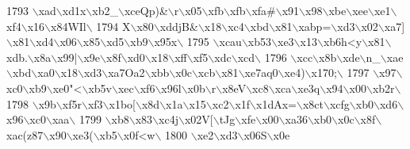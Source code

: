 \begin{DoxyCode}
{1793 \textcolor{stringliteral}{\(\backslash\)xad\(\backslash\)xd1x\(\backslash\)xb2\_\(\backslash\)xceQp)&\(\backslash\)r\(\backslash\)x05\(\backslash\)xfb\(\backslash\)xfb\(\backslash\)xfa#\(\backslash\)x91\(\backslash\)x98\(\backslash\)xbe\(\backslash\)xee\(\backslash\)xe1\(\backslash\)xf4\(\backslash\)x16\(\backslash\)x84WIl\(\backslash\)}
1794 \textcolor{stringliteral}{X\(\backslash\)x80\(\backslash\)xddjB&\(\backslash\)x18\(\backslash\)xc4\(\backslash\)xbd\(\backslash\)x81\(\backslash\)xabp=\(\backslash\)xd3\(\backslash\)x02\(\backslash\)xa7]\(\backslash\)x81\(\backslash\)xd4\(\backslash\)x06\(\backslash\)x85\(\backslash\)xd5\(\backslash\)xb9\(\backslash\)x95x\(\backslash\)}
1795 \textcolor{stringliteral}{\(\backslash\)xcau\(\backslash\)xb53\(\backslash\)xe3\(\backslash\)x13\(\backslash\)xb6h<y\(\backslash\)x81\(\backslash\)xdb.\(\backslash\)x8a\(\backslash\)x99|\(\backslash\)x9e\(\backslash\)x8f\(\backslash\)xd0\(\backslash\)x18\(\backslash\)xff\(\backslash\)xf5\(\backslash\)xdc\(\backslash\)xcd\(\backslash\)}
1796 \textcolor{stringliteral}{\(\backslash\)xcc\(\backslash\)x8b\(\backslash\)xde\(\backslash\)n\_\(\backslash\)xae\(\backslash\)xbd\(\backslash\)xa0\(\backslash\)x18\(\backslash\)xd3\(\backslash\)xa7Oa2\(\backslash\)xbb\(\backslash\)x0c\(\backslash\)xcb\(\backslash\)x81\(\backslash\)xe7aq0\(\backslash\)xe4)\(\backslash\)x170;\(\backslash\)}
1797 \textcolor{stringliteral}{\(\backslash\)x97\(\backslash\)xc0\(\backslash\)xb9\(\backslash\)xe0"<\(\backslash\)xb5v\(\backslash\)xec\(\backslash\)xf6\(\backslash\)x96l\(\backslash\)x0b\(\backslash\)r\(\backslash\)x8eV\(\backslash\)xc8\(\backslash\)xca\(\backslash\)xe3q\(\backslash\)x94\(\backslash\)x00\(\backslash\)xb2r\(\backslash\)}
1798 \textcolor{stringliteral}{\(\backslash\)x9b\(\backslash\)xf5r\(\backslash\)xf3\(\backslash\)x1bo[\(\backslash\)x8d\(\backslash\)x1a\(\backslash\)x15\(\backslash\)xc2\(\backslash\)x1f\(\backslash\)x1dAx=\(\backslash\)x8ct\(\backslash\)xcfg\(\backslash\)xb0\(\backslash\)xd6\(\backslash\)x96\(\backslash\)xc0\(\backslash\)xaa\(\backslash\)}
1799 \textcolor{stringliteral}{\(\backslash\)xb8\(\backslash\)x83\(\backslash\)xc4j\(\backslash\)x02V[\(\backslash\)tJg\(\backslash\)xfe\(\backslash\)x00\(\backslash\)xa36\(\backslash\)xb0\(\backslash\)x0c\(\backslash\)x8f\(\backslash\)xac(z87\(\backslash\)x90\(\backslash\)xe3(\(\backslash\)xb5\(\backslash\)x0f<w\(\backslash\)}
1800 \textcolor{stringliteral}{\(\backslash\)xe2\(\backslash\)xd3\(\backslash\)x06S\(\backslash\)x0e%
}}
\end{DoxyCode}
